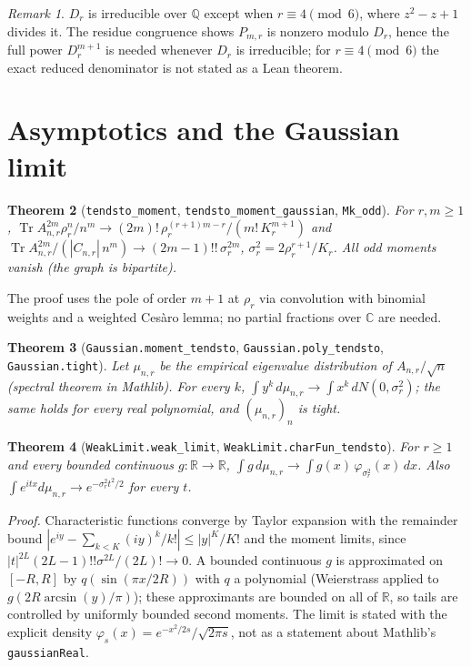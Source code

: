 \documentclass[11pt]{article}
\newtheorem{theorem}{Theorem}
\theoremstyle{remark}\newtheorem{remark}[theorem]{Remark}
\begin{document}
\begin{remark}
$D_r$ is irreducible over $\mathbb Q$ except when $r\equiv4\pmod 6$, where $z^2-z+1$ divides it. The residue congruence shows $P_{m,r}$ is nonzero modulo $D_r$, hence the full power $D_r^{m+1}$ is needed whenever $D_r$ is irreducible; for $r\equiv4\pmod6$ the exact reduced denominator is not stated as a Lean theorem.
\end{remark}

\section{Asymptotics and the Gaussian limit}
\begin{theorem}[\texttt{tendsto\_moment}, \texttt{tendsto\_moment\_gaussian}, \texttt{Mk\_odd}]
For $r,m\ge1$, $\operatorname{Tr}A_{n,r}^{2m}\rho_r^n/n^m\to(2m)!\,\rho_r^{(r+1)m-r}/(m!\,K_r^{m+1})$ and
$\operatorname{Tr}A_{n,r}^{2m}/(|C_{n,r}|\,n^m)\to(2m-1)!!\,\sigma_r^{2m}$, $\sigma_r^2=2\rho_r^{r+1}/K_r$. All odd moments vanish (the graph is bipartite).
\end{theorem}
The proof uses the pole of order $m+1$ at $\rho_r$ via convolution with binomial weights and a weighted Ces\`aro lemma; no partial fractions over $\mathbb C$ are needed.
\begin{theorem}[\texttt{Gaussian.moment\_tendsto}, \texttt{Gaussian.poly\_tendsto}, \texttt{Gaussian.tight}]
Let $\mu_{n,r}$ be the empirical eigenvalue distribution of $A_{n,r}/\sqrt n$ (spectral theorem in Mathlib). For every $k$, $\int y^k\,d\mu_{n,r}\to\int x^k\,dN(0,\sigma_r^2)$; the same holds for every real polynomial, and $(\mu_{n,r})_n$ is tight.
\end{theorem}
\begin{theorem}[\texttt{WeakLimit.weak\_limit}, \texttt{WeakLimit.charFun\_tendsto}]
For $r\ge1$ and every bounded continuous $g:\mathbb R\to\mathbb R$, $\int g\,d\mu_{n,r}\to\int g(x)\,\varphi_{\sigma_r^2}(x)\,dx$. Also $\int e^{itx}d\mu_{n,r}\to e^{-\sigma_r^2t^2/2}$ for every $t$.
\end{theorem}
\emph{Proof.} Characteristic functions converge by Taylor expansion with the remainder bound $|e^{iy}-\sum_{k<K}(iy)^k/k!|\le|y|^K/K!$ and the moment limits, since $|t|^{2L}(2L-1)!!\sigma^{2L}/(2L)!\to0$. A bounded continuous $g$ is approximated on $[-R,R]$ by $q(\sin(\pi x/2R))$ with $q$ a polynomial (Weierstrass applied to $g(2R\arcsin(y)/\pi)$); these approximants are bounded on all of $\mathbb R$, so tails are controlled by uniformly bounded second moments.
The limit is stated with the explicit density $\varphi_{s}(x)=e^{-x^2/2s}/\sqrt{2\pi s}$, not as a statement about Mathlib's \texttt{gaussianReal}.
\end{document}

